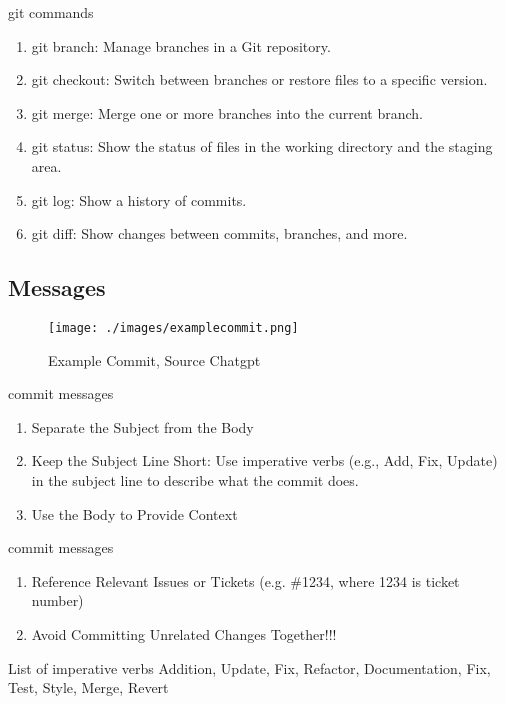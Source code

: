 \begin{frame}
    \begin{content}{git commands}
        \begin{enumerate}
            \item git branch: Manage branches in a Git repository.
            \item git checkout: Switch between branches or restore files to a specific version.
            \item git merge: Merge one or more branches into the current branch.
            \item git status: Show the status of files in the working directory and the staging area.
            \item git log: Show a history of commits.
            \item git diff: Show changes between commits, branches, and more.
        \end{enumerate}
    \end{content}
\end{frame}
\subsection{Messages}
\begin{frame}
    \begin{figure}    
        \texttt{[image: ./images/examplecommit.png]}
        \caption{Example Commit, Source Chatgpt} 
    \end{figure}
    \begin{content}{commit messages}
        \begin{enumerate}
            \item Separate the Subject from the Body
            \item Keep the Subject Line Short: Use imperative verbs (e.g., Add, Fix, Update) in the subject line to describe what the commit does.
            \item Use the Body to Provide Context
        \end{enumerate}
    \end{content}
\end{frame}
\begin{frame}
    \begin{content}{commit messages}
        \begin{enumerate}
            \item Reference Relevant Issues or Tickets (e.g. \#1234, where 1234 is ticket number)
            \item Avoid Committing Unrelated Changes Together!!!
        \end{enumerate}
    \end{content}
    \begin{content}{List of imperative verbs}
        Addition, Update, Fix, Refactor, Documentation, Fix, Test, Style, Merge, Revert
    \end{content}
\end{frame}